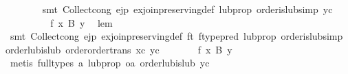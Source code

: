 \begin{isabellebody}
\ \ \ \ \ \ \isamarkupfalse%
\ {}smt\ Collect{}cong\ ejp\ ex{}join{}preserving{}def\ lub{}prop\ order{}is{}lub{}simp\ yc{}\isanewline
\ \ \ \ \isamarkupfalse%
\ \isamarkupfalse%
\ {}{}{}{}\ {}\ f\ x\ {}\isactrlbsub B\isactrlesub \ y{}\ \isamarkupfalse%
\ lem\ \isanewline
\ \ \ \ \ \ \isamarkupfalse%
\ {}smt\ Collect{}cong\ ejp\ ex{}join{}preserving{}def\ ft\ ftype{}pred\ lub{}prop\ order{}is{}lub{}simp\ order{}lub{}is{}lub\ order{}order{}trans\ xc\ yc{}\isanewline
\ \ \ \ \isamarkupfalse%
\ \isamarkupfalse%
\ {}f\ x\ {}\isactrlbsub B\isactrlesub \ y{}\isanewline
\ \ \ \ \ \ \isamarkupfalse%
\ {}metis\ {}full{}types{}\ a\ lub{}prop\ oa\ order{}lub{}is{}lub\ yc{}\isanewline
\ \ \isamarkupfalse%

\end{isabellebody}
